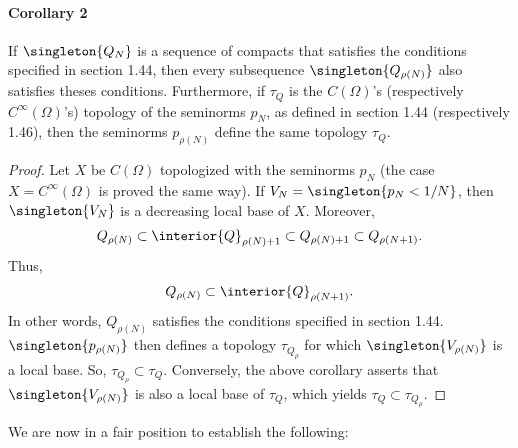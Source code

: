 \paragraph{Corollary 2}
If 
%
  $\singleton{Q_N}$ 
%
is a sequence of compacts that satisfies the conditions specified 
in section 1.44, then every subsequence 
%
  $\singleton{Q_{\rho(N)}}$ 
%
also satisfies theses conditions.
%
Furthermore, if $\tau_{Q}$ is the $C(\Omega)$'s 
(respectively $C^\infty (\Omega)$'s) topology of the seminorms $p_{N}$, 
as defined in section 1.44 (respectively 1.46), then the seminorms 
%
  $p_{\rho(N)}$ 
%
define the same topology $\tau_{Q}$.
%
\begin{proof}%
%
Let $X$ be $C(\Omega)$ topologized with the seminorms $p_{N}$ 
(the case $X=C^\infty(\Omega)$ is proved the same way).
%
If 
    $V_{N} = \singleton{p_{N} < 1/N}$, 
then 
    $\singleton{V_{N}}$ 
is a decreasing local base of $X$.
%
Moreover,
% 
  \begin{align}
    Q_{\rho(N)} 
      \subset 
    \interior{Q}_{\rho(N) + 1} 
      \subset 
    Q_{\rho(N) + 1} 
      \subset 
    Q_{\rho(N+ 1)}.
  \end{align}
% 
Thus,
%
  \begin{align}
    Q_{\rho(N)} 
      \subset 
    \interior{Q}_{\rho(N+ 1)}.
  \end{align}
%
In other words, 
%
  $Q_{\rho(N)}$ satisfies the conditions specified in section 1.44.
%
%
  $\singleton{p_{\rho(N)}}$
% 
then defines a topology $\tau_{Q_\rho}$ for which  
% 
  $\singleton{V_{\rho(N)}}$ 
%
is a local base. So, 
% 
  $\tau_{Q_\rho} \subset \tau_{Q}$.
%
Conversely, the above corollary asserts that 
%
  $\singleton{V_{\rho(N)}}$ 
%
is also a local base of $\tau_{Q}$, which yields  
%
  $\tau_{Q}\subset \tau_{Q_\rho}$.
%
\end{proof}
\noindent We are now in a fair position to establish the following:
